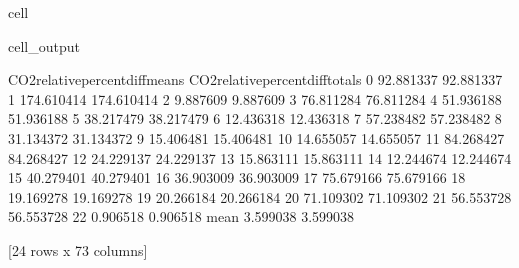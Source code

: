 \documentclass[letterpaper,10pt,english]{jupyterBook}
\begin{document}
\begin{sphinxuseclass}{cell}
\begin{sphinxVerbatimOutput}
\begin{sphinxuseclass}{cell_output}
\begin{sphinxVerbatim}[commandchars=\\\{\}]
      CO2\PYGZus{}relative\PYGZus{}percent\PYGZus{}diff\PYGZus{}means  CO2\PYGZus{}relative\PYGZus{}percent\PYGZus{}diff\PYGZus{}totals  
0                          \PYGZhy{}92.881337                        \PYGZhy{}92.881337  
1                         \PYGZhy{}174.610414                       \PYGZhy{}174.610414  
2                           \PYGZhy{}9.887609                         \PYGZhy{}9.887609  
3                           76.811284                         76.811284  
4                           51.936188                         51.936188  
5                          \PYGZhy{}38.217479                        \PYGZhy{}38.217479  
6                           12.436318                         12.436318  
7                           57.238482                         57.238482  
8                           31.134372                         31.134372  
9                          \PYGZhy{}15.406481                        \PYGZhy{}15.406481  
10                          14.655057                         14.655057  
11                          84.268427                         84.268427  
12                          24.229137                         24.229137  
13                         \PYGZhy{}15.863111                        \PYGZhy{}15.863111  
14                          12.244674                         12.244674  
15                          40.279401                         40.279401  
16                         \PYGZhy{}36.903009                        \PYGZhy{}36.903009  
17                          75.679166                         75.679166  
18                         \PYGZhy{}19.169278                        \PYGZhy{}19.169278  
19                          20.266184                         20.266184  
20                         \PYGZhy{}71.109302                        \PYGZhy{}71.109302  
21                          56.553728                         56.553728  
22                          \PYGZhy{}0.906518                         \PYGZhy{}0.906518  
mean                         3.599038                          3.599038  

[24 rows x 73 columns]
\end{sphinxVerbatim}

\end{sphinxuseclass}\end{sphinxVerbatimOutput}

\end{sphinxuseclass}
\end{document}
